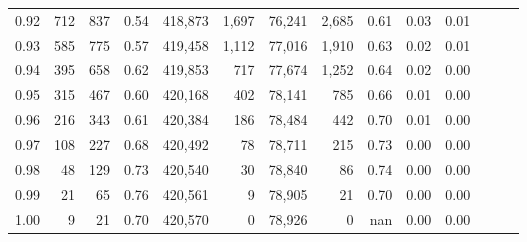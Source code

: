 \begin{tabular}{rrrrrrrrrrrrrr}
0.92 &    712 &    837 &  0.54 &  418,873 &    1,697 &  76,241 &   2,685 &  0.61 &  0.03 &      0.01 \\
0.93 &    585 &    775 &  0.57 &  419,458 &    1,112 &  77,016 &   1,910 &  0.63 &  0.02 &      0.01 \\
0.94 &    395 &    658 &  0.62 &  419,853 &      717 &  77,674 &   1,252 &  0.64 &  0.02 &      0.00 \\
0.95 &    315 &    467 &  0.60 &  420,168 &      402 &  78,141 &     785 &  0.66 &  0.01 &      0.00 \\
0.96 &    216 &    343 &  0.61 &  420,384 &      186 &  78,484 &     442 &  0.70 &  0.01 &      0.00 \\
0.97 &    108 &    227 &  0.68 &  420,492 &       78 &  78,711 &     215 &  0.73 &  0.00 &      0.00 \\
0.98 &     48 &    129 &  0.73 &  420,540 &       30 &  78,840 &      86 &  0.74 &  0.00 &      0.00 \\
0.99 &     21 &     65 &  0.76 &  420,561 &        9 &  78,905 &      21 &  0.70 &  0.00 &      0.00 \\
1.00 &      9 &     21 &  0.70 &  420,570 &        0 &  78,926 &       0 &   nan &  0.00 &      0.00 \\
\bottomrule
\end{tabular}
